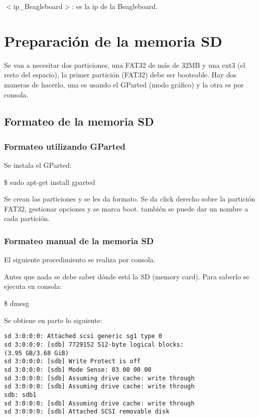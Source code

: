 \bigskip
$<$ip\_Beagleboard$>$: es la ip de la Beagleboard.


\section{Preparación de la memoria SD}\label{sd_prep}

Se van a necesitar dos particiones, una FAT32 de más de 32MB y una ext3 (el resto del espacio), la
primer partición (FAT32) debe ser booteable.
Hay dos maneras de hacerlo, una es usando el GParted (modo gráfico) y la otra es por consola.

\subsection{Formateo de la memoria SD}

\subsubsection{Formateo utilizando GParted}

Se instala el GParted:

\centerline{\$ sudo apt-get install gparted}

Se crean las particiones y se les da formato.
Se da click derecho sobre la partición FAT32, gestionar opciones y se marca boot. también se puede dar un nombre a cada partición.


\subsubsection{Formateo manual de la memoria SD}

El siguiente procedimiento se realiza por consola.

\bigskip
Antes que nada se debe saber dónde está la SD (memory card).
Para saberlo se ejecuta en consola: 

\centerline{\$ dmesg}

\bigskip
Se obtiene en parte lo siguiente: 
\begin{verbatim}
sd 3:0:0:0: Attached scsi generic sg1 type 0 
sd 3:0:0:0: [sdb] 7729152 512-byte logical blocks: 
(3.95 GB/3.68 GiB) 
sd 3:0:0:0: [sdb] Write Protect is off 
sd 3:0:0:0: [sdb] Mode Sense: 03 00 00 00 
sd 3:0:0:0: [sdb] Assuming drive cache: write through 
sd 3:0:0:0: [sdb] Assuming drive cache: write through 
sdb: sdb1 
sd 3:0:0:0: [sdb] Assuming drive cache: write through 
sd 3:0:0:0: [sdb] Attached SCSI removable disk 
\end{verbatim}

